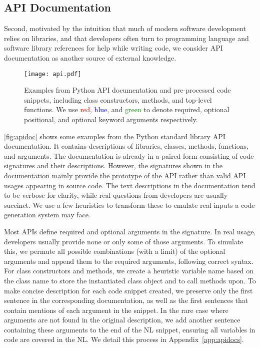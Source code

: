 \documentclass[11pt,a4paper]{article}
\begin{document}
\subsection{API Documentation}
\label{sec:api}
Second, motivated by the intuition that much of modern software development relies on libraries, and that developers often turn to programming language and software library references for help while writing code, 
we consider API documentation as another source of external knowledge.

\begin{figure}
\centering
\texttt{[image: api.pdf]}
\caption{Examples from Python API documentation and pre-processed code snippets, including class constructors, methods, and top-level functions.
We use \textcolor{red}{red}, \textcolor{blue}{blue}, and \textcolor{green}{green} to denote required, optional positional, and optional keyword arguments respectively.}
\vspace{-2mm}
\label{fig:apidoc}
\end{figure}

\autoref{fig:apidoc} shows some examples from the Python standard library API documentation.
It contains descriptions of libraries, classes, methods, functions, and arguments.
The documentation is already in a paired form consisting of code signatures and their descriptions. 
However, the signatures shown in the documentation mainly provide the prototype of the API rather than valid API usages appearing in source code.
The text descriptions in the documentation tend to be verbose for clarity, while real questions from developers are usually succinct.
We use a few heuristics to transform these to emulate real inputs a code generation system may face.

Most APIs define required and optional arguments in the signature.
In real usage, developers usually provide none or only some of those arguments.
To simulate this, we permute all possible combinations (with a limit) of the optional arguments and append them to the required arguments, following correct syntax.
For class constructors and methods, we create a heuristic variable name based on the class name to store the instantiated class object and to call methods upon.
To make concise description for each code snippet created, we preserve only the first sentence in the corresponding documentation, as well as the first sentences that contain mentions of each argument in the snippet.
In the rare case where arguments are not found in the original description, we add another sentence containing these arguments to the end of the NL snippet, ensuring all variables in code are covered in the NL.
We detail this process in Appendix~\ref{app:apidocs}.
\end{document}
